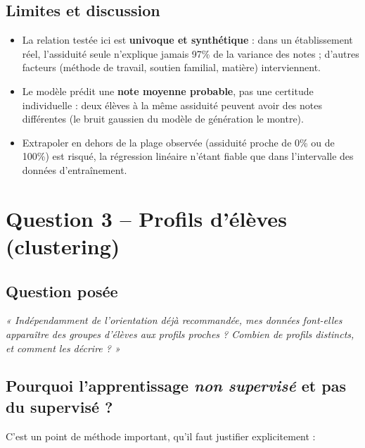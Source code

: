 \documentclass[11pt,a4paper]{article}
\begin{document}
\subsection{Limites et discussion}
\begin{itemize}
\item La relation testée ici est \textbf{univoque et synthétique} : dans un
établissement réel, l'assiduité seule n'explique jamais 97\% de la variance des notes ;
d'autres facteurs (méthode de travail, soutien familial, matière) interviennent.
\item Le modèle prédit une \textbf{note moyenne probable}, pas une certitude
individuelle : deux élèves à la même assiduité peuvent avoir des notes différentes
(le bruit gaussien du modèle de génération le montre).
\item Extrapoler en dehors de la plage observée (assiduité proche de 0\% ou de 100\%)
est risqué, la régression linéaire n'étant fiable que dans l'intervalle des données
d'entraînement.
\end{itemize}

\section{Question 3 -- Profils d'élèves (clustering)}

\subsection{Question posée}
\textit{« Indépendamment de l'orientation déjà recommandée, mes données font-elles
apparaître des groupes d'élèves aux profils proches ? Combien de profils distincts, et
comment les décrire ? »}

\subsection{Pourquoi l'apprentissage \emph{non supervisé} et pas du supervisé ?}

C'est un point de méthode important, qu'il faut justifier explicitement :
\end{document}
